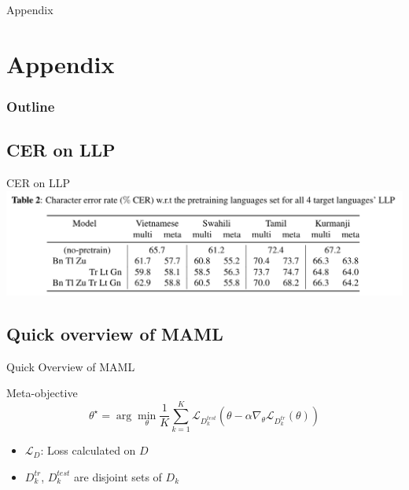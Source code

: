 \documentclass{beamer}
\begin{document}
\begin{frame}
	\begin{center}
    \LARGE{Appendix}
	\end{center}
\end{frame}

\section{Appendix}
\begin{frame}
\frametitle{Outline}
\tableofcontents
\end{frame}

\subsection{CER on LLP}
\begin{frame}[t]{CER on LLP}
  \center \includegraphics[width=1.0\textwidth]{fig/llp_table.png}
\end{frame}

\subsection{Quick overview of MAML}

\begin{frame}[t]{Quick Overview of MAML}
  \label{overview of maml}
  \begin{block}{Meta-objective}
    \begin{equation*}
    \theta^\star = \arg \min_\theta \frac{1}{K}\sum_{k=1}^{K}\mathcal{L}_{D_k^{test}}(\theta - \alpha \nabla_\theta \mathcal{L}_{D_k^{tr}}(\theta))
    \end{equation*}
  \end{block}

  \begin{itemize}
    \item $\mathcal{L}_D$: Loss calculated on $D$
    \item $D_k^{tr}$, $D_k^{test}$ are disjoint sets of $D_k$
  \end{itemize}
\end{frame}
\end{document}
